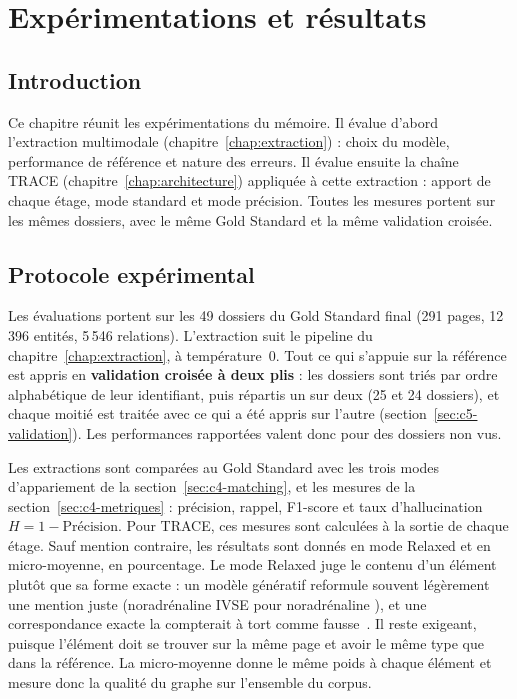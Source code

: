 \chapter{Expérimentations et résultats}
\label{chap:experimentations}

\section{Introduction}\label{sec:c6-intro}

Ce chapitre réunit les expérimentations du mémoire. Il évalue d'abord l'extraction multimodale (chapitre~\ref{chap:extraction}) : choix du modèle, performance de référence et nature des erreurs. Il évalue ensuite la chaîne TRACE (chapitre~\ref{chap:architecture}) appliquée à cette extraction : apport de chaque étage, mode standard et mode précision. Toutes les mesures portent sur les mêmes dossiers, avec le même Gold Standard et la même validation croisée.

\section{Protocole expérimental}\label{sec:c6-protocole}

Les évaluations portent sur les 49 dossiers du Gold Standard final (291 pages, 12\,396 entités, 5\,546 relations). L'extraction suit le pipeline du chapitre~\ref{chap:extraction}, à température~0. Tout ce qui s'appuie sur la référence est appris en \textbf{validation croisée à deux plis} : les dossiers sont triés par ordre alphabétique de leur identifiant, puis répartis un sur deux (25 et 24 dossiers), et chaque moitié est traitée avec ce qui a été appris sur l'autre (section~\ref{sec:c5-validation}). Les performances rapportées valent donc pour des dossiers non vus.

Les extractions sont comparées au Gold Standard avec les trois modes d'appariement de la section~\ref{sec:c4-matching}, et les mesures de la section~\ref{sec:c4-metriques} : précision, rappel, F1-score et taux d'hallucination $H = 1 - \text{Précision}$. Pour TRACE, ces mesures sont calculées à la sortie de chaque étage. Sauf mention contraire, les résultats sont donnés en mode Relaxed et en micro-moyenne, en pourcentage. Le mode Relaxed juge le contenu d'un élément plutôt que sa forme exacte : un modèle génératif reformule souvent légèrement une mention juste (\og noradrénaline IVSE \fg{} pour \og noradrénaline \fg{}), et une correspondance exacte la compterait à tort comme fausse~\cite{wadhwa2023revisiting}. Il reste exigeant, puisque l'élément doit se trouver sur la même page et avoir le même type que dans la référence. La micro-moyenne donne le même poids à chaque élément et mesure donc la qualité du graphe sur l'ensemble du corpus.

